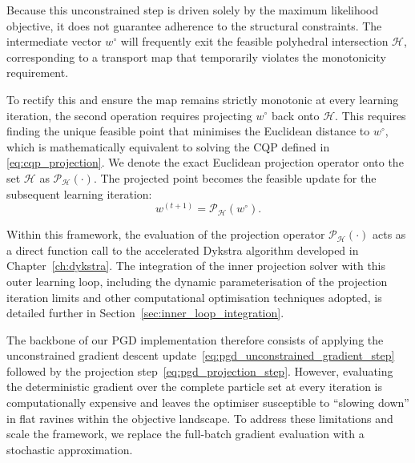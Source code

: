 Because this unconstrained step is driven solely by the maximum likelihood objective, it does not guarantee adherence to the structural constraints. The intermediate vector $w^{\circ}$ will frequently exit the feasible polyhedral intersection $\mathcal{H}$, corresponding to a transport map that temporarily violates the monotonicity requirement.

To rectify this and ensure the map remains strictly monotonic at every learning iteration, the second operation requires projecting $w^{\circ}$ back onto $\mathcal{H}$. This requires finding the unique feasible point that minimises the Euclidean distance to $w^{\circ}$, which is mathematically equivalent to solving the CQP defined in \eqref{eq:cqp_projection}. We denote the exact Euclidean projection operator onto the set $\mathcal{H}$ as $\mathcal{P}_{\mathcal{H}}(\cdot)$. The projected point becomes the feasible update for the subsequent learning iteration:
\begin{equation}
    w^{(t+1)} = \mathcal{P}_{\mathcal{H}}(w^\circ).
    \label{eq:pgd_projection_step}
\end{equation}

Within this framework, the evaluation of the projection operator $\mathcal{P}_{\mathcal{H}}(\cdot)$ acts as a direct function call to the accelerated Dykstra algorithm developed in Chapter~\ref{ch:dykstra}. The integration of the inner projection solver with this outer learning loop, including the dynamic parameterisation of the projection iteration limits and other computational optimisation techniques adopted, is detailed further in Section~\ref{sec:inner_loop_integration}.

The backbone of our PGD implementation therefore consists of applying the unconstrained gradient descent update~\eqref{eq:pgd_unconstrained_gradient_step} followed by the projection step~\eqref{eq:pgd_projection_step}. However, evaluating the deterministic gradient over the complete particle set at every iteration is computationally expensive and leaves the optimiser susceptible to ``slowing down'' in flat ravines within the objective landscape. To address these limitations and scale the framework, we replace the full-batch gradient evaluation with a stochastic approximation.